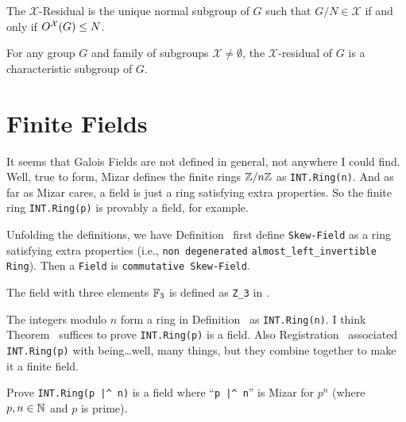 \begin{theorem}
The $\mathcal{X}$-Residual is the unique normal subgroup of $G$ such
that $G/N\in\mathcal{X}$ if and only if $O^{\mathcal{X}}(G)\leq N$.
\end{theorem}

\begin{theorem}
For any group $G$ and family of subgroups $\mathcal{X}\neq\emptyset$,
the $\mathcal{X}$-residual of $G$ is a characteristic subgroup of $G$.
\end{theorem}

\section{Finite Fields}

It seems that Galois Fields are not defined in
general, not anywhere I could find. Well, true to form, Mizar defines
the finite rings $\ZZ/n\ZZ$ as \lstinline{INT.Ring(n)}. And as far as
Mizar cares, a field is just a ring satisfying extra properties. So the
finite ring \lstinline{INT.Ring(p)} is provably a field, for example.

Unfolding the definitions, we have Definition~
first define \lstinline{Skew-Field} as a ring satisfying extra properties
(i.e., \lstinline{non degenerated} \lstinline{almost_left_invertible} \lstinline{Ring}).
Then a \lstinline{Field} is \lstinline{commutative Skew-Field}.

\begin{example}[{$\FF_{3}$}]
The field with three elements $\FF_{3}$ is defined as \lstinline!Z_3!
in .
\end{example}

\begin{example}[{$\ZZ/n\ZZ$}]
The integers modulo $n$ form a ring in Definition~ as
\lstinline{INT.Ring(n)}. I think Theorem~ suffices to
prove \lstinline{INT.Ring(p)} is a field. Also Registration~
associated \lstinline{INT.Ring(p)} with being\dots well, many things,
but they combine together to make it a finite field.
\end{example}

\begin{exercise}
Prove \lstinline{INT.Ring(p |^ n)} is a field where ``\lstinline{p |^ n}''
is Mizar for $p^{n}$ (where $p,n\in\mathbb{N}$ and $p$ is prime).
\end{exercise}

